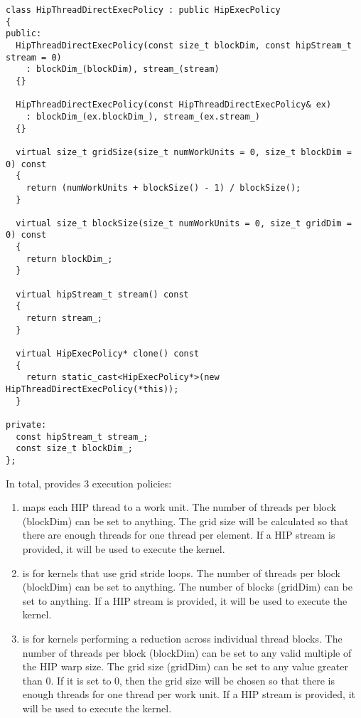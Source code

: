 \begin{verbatim}
class HipThreadDirectExecPolicy : public HipExecPolicy
{
public:
  HipThreadDirectExecPolicy(const size_t blockDim, const hipStream_t stream = 0)
    : blockDim_(blockDim), stream_(stream)
  {}

  HipThreadDirectExecPolicy(const HipThreadDirectExecPolicy& ex)
    : blockDim_(ex.blockDim_), stream_(ex.stream_)
  {}

  virtual size_t gridSize(size_t numWorkUnits = 0, size_t blockDim = 0) const
  {
    return (numWorkUnits + blockSize() - 1) / blockSize();
  }

  virtual size_t blockSize(size_t numWorkUnits = 0, size_t gridDim = 0) const
  {
    return blockDim_;
  }

  virtual hipStream_t stream() const
  {
    return stream_;
  }

  virtual HipExecPolicy* clone() const
  {
    return static_cast<HipExecPolicy*>(new HipThreadDirectExecPolicy(*this));
  }

private:
  const hipStream_t stream_;
  const size_t blockDim_;
};
\end{verbatim}

In total, {\sundials} provides 3 execution policies:

\begin{enumerate}
  \item {}
    maps each HIP thread to a work unit. The number of threads per block (blockDim) can be set
    to anything. The grid size will be calculated so that there are enough threads for one
    thread per element. If a HIP stream is provided, it will be used to execute the kernel.

  \item {}
    is for kernels that use grid stride loops. The number of threads per block (blockDim)
    can be set to anything. The number of blocks (gridDim) can be set to anything. If a
    HIP stream is provided, it will be used to execute the kernel.

  \item {}
    is for kernels performing a reduction across individual thread blocks. The number of threads
    per block (blockDim) can be set to any valid multiple of the HIP warp size. The grid size
    (gridDim) can be set to any value greater than 0. If it is set to 0, then the grid size
    will be chosen so that there is enough threads for one thread per work unit. If a
    HIP stream is provided, it will be used to execute the kernel.
\end{enumerate}

